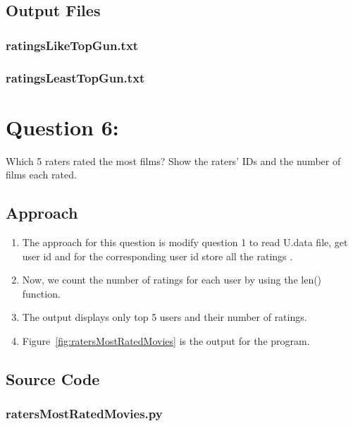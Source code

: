 \documentclass[12pt]{article}
\begin{document}
\subsection{Output Files}
\subsubsection{ratingsLikeTopGun.txt}

\newpage
\subsubsection{ratingsLeastTopGun.txt}

\newpage

\section{Question 6:}
Which 5 raters rated the most films? Show the raters' IDs and
the number of films each rated.
\subsection{Approach}

\begin{enumerate}
    \item The approach for this question is modify question 1 to read U.data file, get user id and for the corresponding user id store all the ratings . 
    \item Now, we count the number of ratings for each user by using the len() function.
    \item The output displays only top 5 users and their number of ratings. 
    \item Figure~\ref{fig:ratersMostRatedMovies} is the output for the program.
\end{enumerate}
\newpage
\subsection{Source Code}
\subsubsection{ratersMostRatedMovies.py}

\newpage
\end{document}
